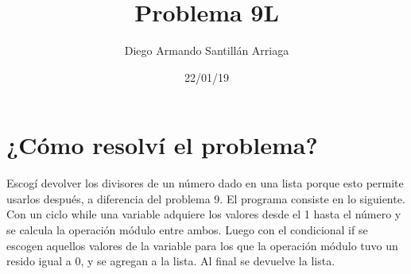 \documentclass[letterpaper, 12pt, oneside]{article}%
\title{\Huge Problema 9L}
\author{Diego Armando Santillán Arriaga}
\date{22/01/19}
\begin{document}
\maketitle
\newpage
\section*{¿Cómo resolví el problema?}
 Escogí devolver los divisores de un número dado en una lista porque esto permite usarlos después, a diferencia del problema 9. 
 El programa consiste en lo siguiente. Con un ciclo while una variable adquiere los valores desde el 1 hasta el número y se calcula la operación módulo entre ambos. Luego con el condicional if se escogen aquellos valores de la variable para los que la operación módulo tuvo un resido igual a 0, y se agregan a la lista. Al final se devuelve la lista. 
\end{document}
